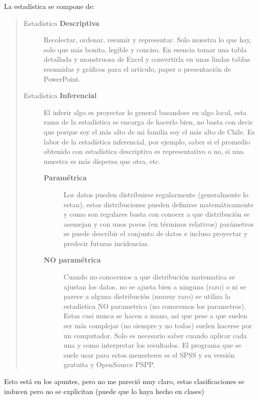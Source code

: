 \documentclass[letterpaper,10pt,openany,oneside]{sphinxmanual}
\begin{document}
La estadística se compone de:
\begin{quote}
\begin{description}
\item[{Estadística \textbf{Descriptiva}}] \leavevmode
Recolectar, ordenar, resumir y representar. Solo muestra lo que hay, solo que más
bonito, legible y conciso. En esencia tomar una tabla detallada y monstruosa de Excel
y convertirla en unas lindas tablas resumidas y gráficos para el artículo, paper o
presentación de PowerPoint.

\item[{Estadística \textbf{Inferencial}}] \leavevmode
El inferir algo es proyectar lo general basandose en algo local, esta rama de la
estadística se encarga de hacerlo bien, no basta con decir que porque soy el más alto
de mi familia soy el más alto de Chile. Es labor de la estadística inferencial, por
ejemplo, saber si el promedio obtenido con estadística descriptiva es representativo o
no, si una muestra es más dispersa que otra, etc.
\begin{description}
\item[{\textbf{Paramétrica}}] \leavevmode
Los datos pueden distribuirse regularmente (generalmente lo estan), estas
distribuciones pueden definirse matemáticamente y como son regulares basta con
conocer a que distribución se asemejan y con unos pocos (en términos relativos)
parámetros se puede describir el conjunto de datos e incluso proyectar y predecir
futuras incidencias.

\item[{\textbf{NO paramétrica}}] \leavevmode
Cuando no conocemos a que distribución matematica se ajustan los datos, no se
ajusta bien a ninguna (raro) o ni se parece a alguna distribución (muuuy raro) se
utiliza la estadística NO parametrica (no conocemos los parametros).
Estas casi nunca se hacen a mano, asi que pese a que suelen ser más complejas (no
siempre y no todas) suelen hacerse por un computador. Solo es necesario saber cuando
aplicar cada una y como interpretar los resultados. El programa que se suele usar
para estos menesteres es el SPSS y su versión gratuita y OpenSource PSPP.

\end{description}

\end{description}
\end{quote}

Esto está en los apuntes, pero no me pareció muy claro, estas clasificaciones se inducen
pero no se explicitan (puede que lo haya hecho en clases)
\end{document}

